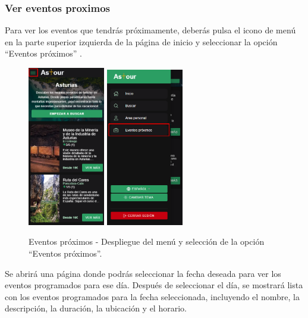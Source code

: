 \subsubsection{Ver eventos proximos}
Para ver los eventos que tendrás próximamente, deberás pulsa el icono de menú en la parte superior izquierda de la página de inicio y seleccionar la opción “Eventos próximos” .
\begin{figure}[H]
	\centering
	\includegraphics[width=0.3\textwidth]{7-Construccion/Manuales/mobile/menu marcado.png}
	\includegraphics[width=0.3\textwidth]{7-Construccion/Manuales/mobile/eventos proximos marcado.png}
	\caption{Eventos próximos - Despliegue del menú y selección de la opción “Eventos próximos”.}
\end{figure}
Se abrirá una página donde podrás seleccionar la fecha deseada para ver los eventos programados para ese día.
Después de seleccionar el día, se mostrará lista con los eventos programados para la fecha seleccionada, incluyendo el nombre, la descripción, la duración, la ubicación y el horario.
